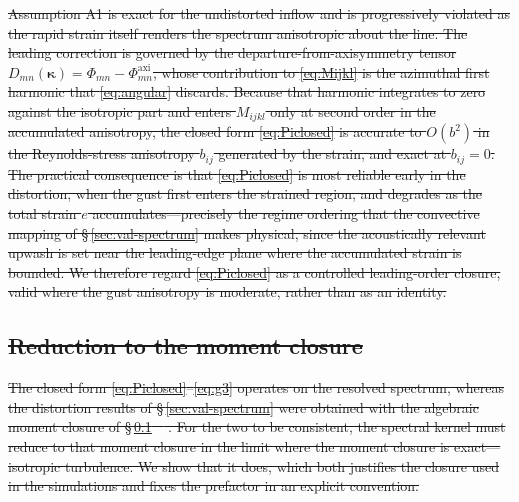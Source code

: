 \documentclass[lineno]{JFM-FLM_Au}
\providecommand{\DIFdel}[1]{{\protect\color{red}\sout{#1}}}                      %
\begin{document}
\DIFdel{Assumption A1 is exact for the undistorted inflow and is progressively
violated as the rapid strain itself renders the spectrum anisotropic about the
line. The leading correction is governed by the departure-from-axisymmetry
tensor $D_{mn}(\boldsymbol{\kappa})
=\Phi_{mn}-\Phi^{\mathrm{axi}}_{mn}$, whose contribution to
\eqref{eq:Mijkl} is the azimuthal first harmonic that \eqref{eq:angular}
discards. Because that harmonic integrates to zero against the isotropic part
and enters $M_{ijkl}$ only at second order in the accumulated anisotropy, the
closed form \eqref{eq:Piclosed} is accurate to $O(b^2)$ in the Reynolds-stress
anisotropy $b_{ij}$ generated by the strain, and exact at $b_{ij}=0$. The
practical consequence is that \eqref{eq:Piclosed} is most reliable early in
the distortion, when the gust first enters the strained region, and degrades
as the total strain $e$ accumulates---precisely the regime ordering that the
convective mapping of \S\,\ref{sec:val-spectrum} makes physical, since the
acoustically relevant upwash is set near the leading-edge plane where the
accumulated strain is bounded. We therefore regard \eqref{eq:Piclosed} as a
controlled leading-order closure, valid where the gust anisotropy is moderate,
rather than as an identity.
}%

\subsection{\DIFdel{Reduction to the moment closure}}%
\addtocounter{subsection}{-1}%

\DIFdel{The closed form \eqref{eq:Piclosed}--\eqref{eq:g3} operates on the resolved
spectrum, whereas the distortion results of \S\,\ref{sec:val-spectrum} were
obtained with the algebraic moment closure of \S\,\ref{}%
\mbox{%
\citep{LaunderReeceRodi1975}}\hskip0pt%
. For the two to be consistent, the spectral
kernel must reduce to that moment closure in the limit where the moment
closure is exact---isotropic turbulence. We show that it does, which both
justifies the closure used in the simulations and fixes the prefactor in an
explicit convention.
}%
\end{document}
